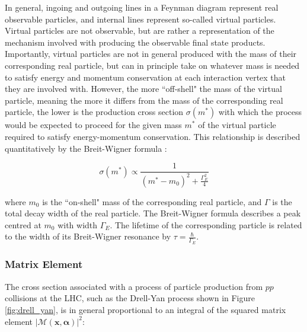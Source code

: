 In general, ingoing and outgoing lines in a Feynman diagram represent real observable particles, and internal lines represent so-called virtual particles. Virtual particles are not observable, but are rather a representation of the mechanism involved with producing the observable final state products. Importantly, virtual particles are not in general produced with the mass of their corresponding real particle, but can in principle take on whatever mass is needed to satisfy energy and momentum conservation at each interaction vertex that they are involved with. However, the more ``off-shell" the mass of the virtual particle, meaning the more it differs from the mass of the corresponding real particle, the lower is the production cross section \(\sigma(m^{*})\) with which the process would be expected to proceed for the given mass \(m^{*}\) of the virtual particle required to satisfy energy-momentum conservation. This relationship is described quantitatively by the Breit-Wigner formula \cite{breit_wigner}:

\begin{equation}
\label{eq:breit_wigner}
\sigma(m^{*}) \propto \frac{1}{(m^{*}-m_0)^2 + \frac{\Gamma_E^2}{4}}
\end{equation}

\noindent where \(m_0\) is the ``on-shell" mass of the corresponding real particle, and \(\Gamma\) is the total decay width of the real particle. The Breit-Wigner formula describes a peak centred at \(m_0\) with width \(\Gamma_E\). The lifetime of the corresponding particle is related to the width of its Breit-Wigner resonance by \(\tau = \frac{\hbar}{\Gamma_E}\).

\subsubsection{Matrix Element}


The cross section associated with a process of particle production from \(pp\) collisions at the LHC, such as the Drell-Yan process shown in Figure \ref{fig:drell_yan}, is in general proportional to an integral of the squared matrix element \(|\mathcal{M(\boldsymbol{x}, \boldsymbol{\alpha})}|^2\):


